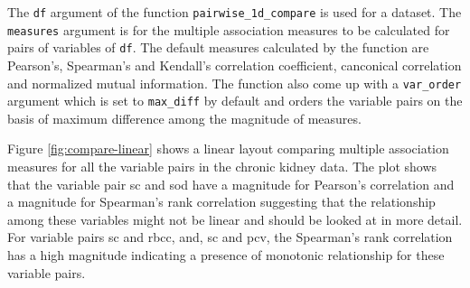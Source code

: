 The \texttt{df} argument of the function \texttt{pairwise\_1d\_compare}
is used for a dataset. The \texttt{measures} argument is for the
multiple association measures to be calculated for pairs of variables of
\texttt{df}. The default measures calculated by the function are
Pearson's, Spearman's and Kendall's correlation coefficient, canconical
correlation and normalized mutual information. The function also come up
with a \texttt{var\_order} argument which is set to \texttt{max\_diff}
by default and orders the variable pairs on the basis of maximum
difference among the magnitude of measures.

Figure \ref{fig:compare-linear} shows a linear layout comparing multiple
association measures for all the variable pairs in the chronic kidney
data. The plot shows that the variable pair sc and sod have a magnitude
for Pearson's correlation and a magnitude for Spearman's rank
correlation suggesting that the relationship among these variables might
not be linear and should be looked at in more detail. For variable pairs
sc and rbcc, and, sc and pcv, the Spearman's rank correlation has a high
magnitude indicating a presence of monotonic relationship for these
variable pairs.

